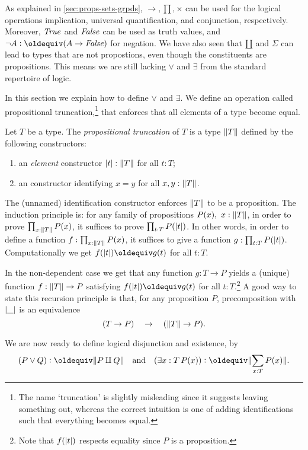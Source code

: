 As explained in \cref{sec:props-sets-grpds}, $\to,\prod,\times$ 
can be used for the logical operations implication, 
universal quantification, and conjunction, respectively.
Moreover, $\mathop{\mathit{True}}$ and $\mathop{\mathit{False}}$ can be used as truth values,
and $\neg A \defeq (A\to\false)$ for negation.
We have also seen that ${\amalg}$ and $\Sigma$ can lead to types
that are not propostions, even though the constituents are
propositions. This means we are still lacking $\vee$ and $\exists$
from the standard repertoire of logic.

In this section we explain how to define $\vee$ and $\exists$.
We define an operation called propositional truncation,\footnote{%
The name `truncation' is slightly misleading since it suggests leaving
something out, whereas the correct intuition is one of adding identifications
such that everything becomes equal.}
that enforces that all elements of a type become equal.

\begin{definition}\label{def:prop-trunc}
Let $T$ be a type. The \emph{propositional truncation} of $T$
is a type  $\lVert T\rVert$ defined by the following constructors:
\begin{enumerate}
\item an \emph{element} constructor $\lvert t\rvert : \lVert T\rVert$ for all $t:T$;
\item an constructor identifying $x=y$  for all $x,y:\lVert T\rVert$.
\end{enumerate}
The (unnamed) identification constructor enforces $\lVert T\rVert$ to be a
proposition. The induction principle is: 
for any family of propositions $P(x),~x:\lVert T\rVert$, 
in order to prove $\prod_{x:\lVert T\rVert} P(x)$,
it suffices to prove $\prod_{t:T} P(\lvert t\rvert)$. In other
words, in order to define a function $f:\prod_{x:\lVert T\rVert} P(x)$,
it suffices to give a function $g: \prod_{t:T} P(\lvert t\rvert)$.
Computationally we get $f(\trunc{t})\jdeq g(t)$ for all $t:T$. 
\end{definition}

In the non-dependent case we get that
any function $g: T\to P$ yields a (unique) function $f:\lVert T\rVert\to P$ 
satisfying $f(\trunc{t})\jdeq g(t)$ for all $t:T$.\footnote{%
Note that $f(\lvert t\rvert)$ respects equality since $P$ is a proposition.}
A good way to state this recursion principle is that, 
for any proposition $P$, precomposition with $\lvert\_\rvert$ is an equivalence
\[
(T \to P) \quad \to \quad (\lVert T\rVert \to P).
\]

We are now ready to define logical disjunction and existence, by
\[
(P \vee Q) \defeq \Trunc{P \amalg Q} \quad\text{and}
\quad (\exists x:T\,P(x)) \defeq \Trunc{\sum_{x:T}P(x)}.
\]

